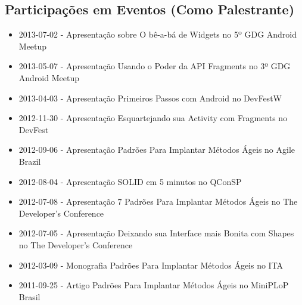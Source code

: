 \documentclass[a4paper, oneside, final]{article}
\begin{document}
\begin{center}
\section{Participações em Eventos (Como Palestrante)}
\begin{itemize}
	\item 2013-07-02 - Apresentação sobre O bê-a-bá de Widgets no 5º GDG Android Meetup
	\item 2013-05-07 - Apresentação Usando o Poder da API Fragments no 3º GDG Android Meetup
	\item 2013-04-03 - Apresentação Primeiros Passos com Android no DevFestW
	\item 2012-11-30 - Apresentação Esquartejando sua Activity com Fragments no DevFest
	\item 2012-09-06 - Apresentação Padrões Para Implantar Métodos Ágeis no Agile Brazil
	\item 2012-08-04 - Apresentação SOLID em 5 minutos no QConSP
	\item 2012-07-08 - Apresentação 7 Padrões Para Implantar Métodos Ágeis no The Developer's Conference
	\item 2012-07-05 - Apresentação Deixando sua Interface mais Bonita com Shapes no The Developer's Conference
	\item 2012-03-09 - Monografia Padrões Para Implantar Métodos Ágeis no ITA
	\item 2011-09-25 - Artigo Padrões Para Implantar Métodos Ágeis no MiniPLoP Brasil
\end{itemize}


\end{center}
\end{document}
